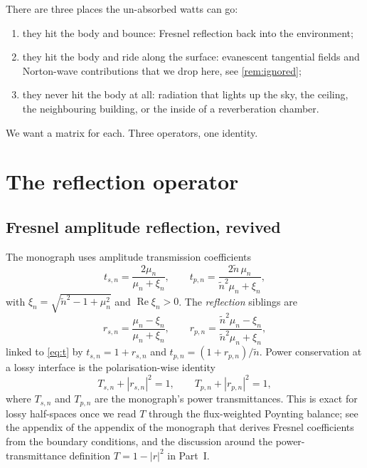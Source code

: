 \documentclass[11pt,a4paper]{article}
\theoremstyle{definition}
\DeclareMathOperator{\RE}{Re}
\begin{document}
There are three places the un-absorbed watts can go:
\begin{enumerate}[leftmargin=1.6em,itemsep=2pt]
\item they hit the body and bounce: Fresnel reflection back into
      the environment;
\item they hit the body and ride along the surface: evanescent
      tangential fields and Norton-wave contributions that we drop
      here, see \cref{rem:ignored};
\item they never hit the body at all: radiation that lights up the
      sky, the ceiling, the neighbouring building, or the inside of
      a reverberation chamber.
\end{enumerate}
We want a matrix for each.  Three operators, one identity.

\section{The reflection operator}

\subsection{Fresnel amplitude reflection, revived}

The monograph uses amplitude transmission coefficients
\begin{equation}\label{eq:t}
  t_{s,n}=\frac{2\mu_n}{\mu_n+\xi_n},\qquad
  t_{p,n}=\frac{2\tilde n\,\mu_n}{\tilde n^2\mu_n+\xi_n},
\end{equation}
with $\xi_n=\sqrt{\tilde n^2-1+\mu_n^2}$ and $\RE\xi_n>0$.
The \emph{reflection} siblings are
\begin{equation}\label{eq:r}
  r_{s,n}=\frac{\mu_n-\xi_n}{\mu_n+\xi_n},\qquad
  r_{p,n}=\frac{\tilde n^2\mu_n-\xi_n}{\tilde n^2\mu_n+\xi_n},
\end{equation}
linked to \cref{eq:t} by $t_{s,n}=1+r_{s,n}$ and
$t_{p,n}=(1+r_{p,n})/\tilde n$.  Power conservation at a lossy
interface is the polarisation-wise identity
\begin{equation}\label{eq:fresnel-energy}
  T_{s,n}+|r_{s,n}|^2=1,\qquad T_{p,n}+|r_{p,n}|^2=1,
\end{equation}
where $T_{s,n}$ and $T_{p,n}$ are the monograph's power
transmittances.  This is exact for lossy half-spaces once we read
$T$ through the flux-weighted Poynting balance; see the appendix of
the appendix of the monograph that derives Fresnel coefficients
from the boundary conditions, and the discussion around the
power-transmittance definition $T=1-|r|^2$ in Part~I.
\end{document}
